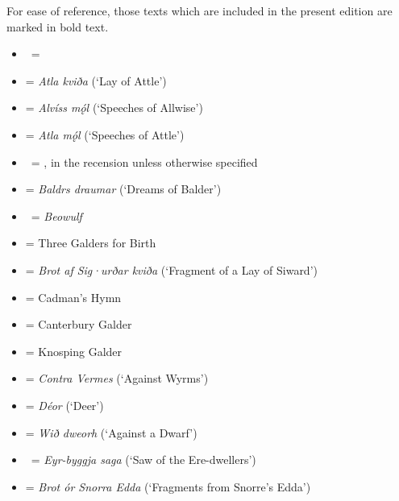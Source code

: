 \newcommand{\Waldere}{%
	\emph{Wald}%
}
\newcommand{\Wessobrunn}{%
	\emph{Wessobrunn}%
}
\newcommand{\Widsith}{%
	\emph{Wíd}%
}
\newcommand{\WidDweorh}{%
	\emph{Dweorh}%
}
\newcommand{\WidFerstice}{%
	\emph{Fǽrst}%
}
\newcommand{\WidYmbe}{%
	\emph{Ymbe}%
}
\newcommand{\Wulf}{%
	\emph{Wulf}%
}
\newcommand{\YnglingaSaga}{%
	\emph{Yng}%
}
\newcommand{\Ynglingatal}{%
	\emph{Yt}%
}

For ease of reference, those texts which are included in the present edition are marked in bold text.

\begin{itemize}%
	\item \AitareyaBrahmana\ = 
	\item \textbf{} = \emph{Atla kviða} (‘Lay of Attle’)
	\item \textbf{} = \emph{Alvíss mǫ́l} (‘Speeches of Allwise’)
	\item \textbf{} = \emph{Atla mǫ́l} (‘Speeches of Attle’)
	\item \Atharvaveda\ = , in the  recension unless otherwise specified
	\item \textbf{} = \emph{Baldrs draumar} (‘Dreams of Balder’)
	\item \Beowulf\ = \emph{Beowulf}
	\item \textbf{} = Three Galders for Birth
	\item \textbf{} = \emph{Brot af Sig·urðar kviða} (‘Fragment of a Lay of Siward’)
	\item \textbf{} = Cadman’s Hymn
	\item \textbf{} = Canterbury Galder
	\item \textbf{} = Knosping Galder
	\item \textbf{} = \emph{Contra Vermes} (‘Against Wyrms’)
	\item \textbf{} = \emph{Déor} (‘Deer’)
	\item \textbf{} = \emph{Wið dweorh} (‘Against a Dwarf’)
	\item \EyrbyggjaSaga\ = \emph{Eyr-byggja saga} (‘Saw of the Ere-dwellers’)
	\item \textbf{} = \emph{Brot ór Snorra Edda} (‘Fragments from Snorre’s Edda’)

\end{itemize}
